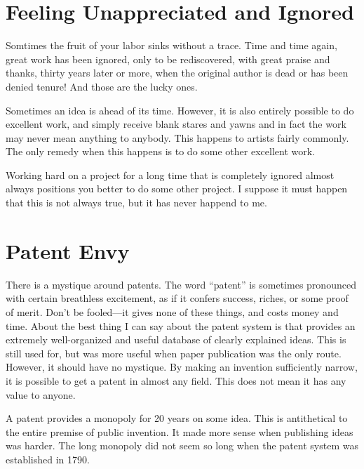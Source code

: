 \documentclass[
	fontsize=10pt, %
	twoside=false, %
	secnumdepth=1, %
]{kaobook}
\begin{document}
\section{Feeling Unappreciated and Ignored}

Somtimes the fruit of your labor sinks without a trace.
Time and time again, great work has been ignored, only to be
rediscovered, with great praise and thanks, thirty years later or more,
when the original author is dead or has been denied tenure!
And those are the lucky ones.

Sometimes an idea is ahead of its time.
However, it is also entirely possible to do excellent work, and simply
receive blank stares and yawns and in fact the work may never
mean anything to anybody.
This happens to artists fairly commonly.
The only remedy when this happens is to do some other excellent work.

Working hard on a project for a long time that is completely ignored
almost always positions you better to do some other project.
I suppose it must happen that this is not always true,
but it has never happend to me.

\section{Patent Envy}
\label{sec:patentenvy}

There is a mystique around patents.
The word ``patent'' is sometimes pronounced with certain
breathless excitement, as if it confers success, riches,
or some proof of merit.
Don't be fooled---it gives none of these things,
and costs money and time.
About the best thing I can say about the patent system
is that provides an extremely well-organized and useful
database of clearly explained ideas.
This is still used for, but was more useful
when paper publication was the only route.
However, it should have no mystique.
By making an invention sufficiently narrow, it
is possible to get a patent in almost any field.
This does not mean it has any value to anyone.


A patent provides a monopoly for 20 years on some idea.
This is antithetical to the entire premise of public invention.
It made more sense when publishing ideas was harder.
The long monopoly did not seem so long when the patent system
was established in 1790.
\end{document}
